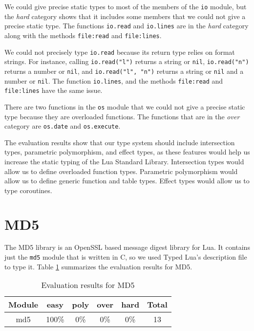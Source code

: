 We could give precise static types to most of the members of the
\texttt{io} module, but the \emph{hard} category shows that it
includes some members that we could not give a precise static type.
The functions \texttt{io.read} and \texttt{io.lines} are
in the \emph{hard} category along with the methods
\texttt{file:read} and \texttt{file:lines}.

We could not precisely type \texttt{io.read} because its return type
relies on format strings.
For instance, calling \texttt{io.read("l")} returns a string or \texttt{nil},
\texttt{io.read("n")} returns a number or \texttt{nil}, and
\texttt{io.read("l", "n")} returns a string or \texttt{nil} and a number or \texttt{nil}.
The function \texttt{io.lines}, and the methods \texttt{file:read} and
\texttt{file:lines} have the same issue.

There are two functions in the \texttt{os} module that we could
not give a precise static type because they are overloaded functions.
The functions that are in the \emph{over} category are
\texttt{os.date} and \texttt{os.execute}.

The evaluation results show that our type system should include
intersection types, parametric polymorphism, and effect types,
as these features would help us increase the static typing of the
Lua Standard Library.
Intersection types would allow us to define overloaded function types.
Parametric polymorphism would allow us to define generic function and table types.
Effect types would allow us to type coroutines.

\section{MD5}

The MD5 library is an OpenSSL based message digest library for Lua.
It contains just the \texttt{md5} module that is written in C,
so we used Typed Lua's description file to type it.
Table \ref{tab:evalmd5} summarizes the evaluation results for MD5.

\begin{table}[!ht]
\begin{center}
\begin{tabular}{|c|c|c|c|c|c|}
\hline
\textbf{Module} & \textbf{easy} & \textbf{poly} & \textbf{over} & \textbf{hard} & \textbf{Total} \\
\hline
md5 & 100\% & 0\% & 0\% & 0\% & 13 \\ %
\hline
\end{tabular}
\end{center}
\caption{Evaluation results for MD5}
\label{tab:evalmd5}
\end{table}

